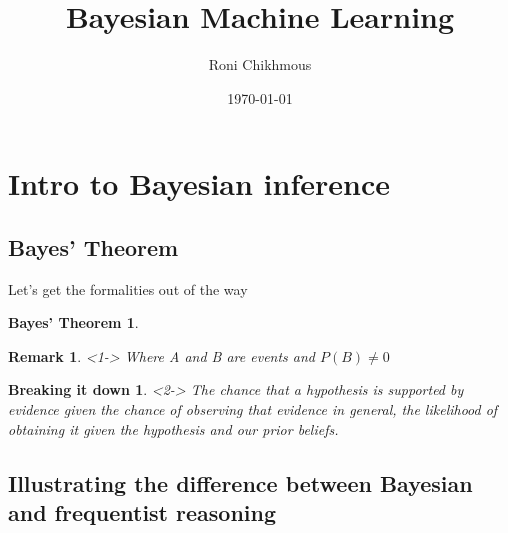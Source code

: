 \documentclass[pdf,dvipsnames]{beamer}
\title{Bayesian Machine Learning}
\subtitle{}
\author{Roni Chikhmous}
\date{\today}
\begin{document}

\begin{frame}
	\thispagestyle{empty}
	\titlepage
\end{frame}
\addtocounter{framenumber}{-1}

\section{Intro to Bayesian inference}

\subsection{Bayes' Theorem}

\newtheorem{bayesthm}{Bayes' Theorem}
\newtheorem{bayesrmk}{Remark}
\newtheorem{bayesexplained}{Breaking it down}
\begin{frame}{Let's get the formalities out of the way}
	\begin{bayesthm}
	\end{bayesthm}
	\begin{bayesrmk}<1->
	Where A and B are events and $P(B) \neq 0$
	\end{bayesrmk}
	\begin{bayesexplained}<2->
	The {\color{red} chance} that a {\color{blue} hypothesis} is supported by {\color{orange} evidence} given the {\color{purple} chance of observing that evidence in general}, {\color{brown} the likelihood of obtaining it given the hypothesis} and {\color{OliveGreen} our prior beliefs}.
	\end{bayesexplained}
\end{frame}

\subsection{Illustrating the difference between Bayesian and frequentist reasoning}
\end{document}
